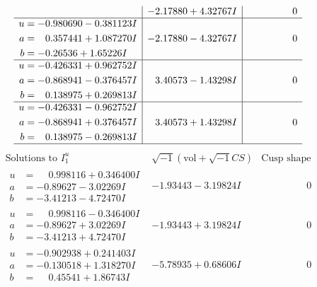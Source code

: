 \documentclass[1p]{elsarticle_modified}
\theoremstyle{definition}
\newcommand{\I}{\sqrt{-1}}
\begin{document}
$$\begin{array}{c|c|c}
 & -2.17880 + 4.32767 I & \phantom{-0.000000 } 0 \\ \hline\begin{aligned}
u &= -0.980690 - 0.381123 I \\
a &= \phantom{-}0.357441 + 1.087270 I \\
b &= -0.26536 + 1.65226 I\end{aligned}
 & -2.17880 - 4.32767 I & \phantom{-0.000000 } 0 \\ \hline\begin{aligned}
u &= -0.426331 + 0.962752 I \\
a &= -0.868941 - 0.376457 I \\
b &= \phantom{-}0.138975 + 0.269813 I\end{aligned}
 & \phantom{-}3.40573 - 1.43298 I & \phantom{-0.000000 } 0 \\ \hline\begin{aligned}
u &= -0.426331 - 0.962752 I \\
a &= -0.868941 + 0.376457 I \\
b &= \phantom{-}0.138975 - 0.269813 I\end{aligned}
 & \phantom{-}3.40573 + 1.43298 I & \phantom{-0.000000 } 0\\
 \hline 
 \end{array}$$\newpage$$\begin{array}{c|c|c}  
\text{Solutions to }I^u_{1}& \I (\text{vol} + \sqrt{-1}CS) & \text{Cusp shape}\\
 \hline 
\begin{aligned}
u &= \phantom{-}0.998116 + 0.346400 I \\
a &= -0.89627 - 3.02269 I \\
b &= -3.41213 - 4.72470 I\end{aligned}
 & -1.93443 - 3.19824 I & \phantom{-0.000000 } 0 \\ \hline\begin{aligned}
u &= \phantom{-}0.998116 - 0.346400 I \\
a &= -0.89627 + 3.02269 I \\
b &= -3.41213 + 4.72470 I\end{aligned}
 & -1.93443 + 3.19824 I & \phantom{-0.000000 } 0 \\ \hline\begin{aligned}
u &= -0.902938 + 0.241403 I \\
a &= -0.130518 + 1.318270 I \\
b &= \phantom{-}0.45541 + 1.86743 I\end{aligned}
 & -5.78935 + 0.68606 I & \phantom{-0.000000 } 0 \\ \hline\begin{aligned}

\end{aligned}
\end{array}$$
\end{document}
